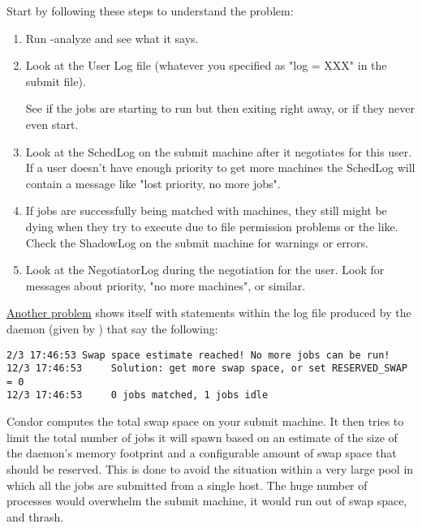 Start by following these steps to understand the problem:

\begin{enumerate}

\item Run  -analyze and see what it says.

\item Look at the User Log file (whatever you specified as "log = XXX"
in the submit file).

See if the jobs are starting to run but then exiting right away, or if
they never even start.

\item Look at the SchedLog on the submit machine after it negotiates
for this user.
If a user doesn't have enough priority to get more machines the
SchedLog will contain a message like "lost priority, no more jobs".

\item If jobs are successfully being matched with machines, they
still might be dying when they try to execute due to file permission
problems or the like.
Check the ShadowLog on the submit machine for warnings or errors.

\item Look at the NegotiatorLog during the negotiation for the user.
Look for messages about priority, "no more machines", or similar.

\end{enumerate}

\underline{Another problem} shows itself
with statements within the log file produced by the 
daemon (given by )
that say the following:

\footnotesize
\begin{verbatim}
2/3 17:46:53 Swap space estimate reached! No more jobs can be run!
12/3 17:46:53     Solution: get more swap space, or set RESERVED_SWAP = 0
12/3 17:46:53     0 jobs matched, 1 jobs idle
\end{verbatim}
\normalsize

Condor computes the total swap space on your submit machine.
It then tries to limit the total number of jobs it
will spawn based on an estimate of the size of the 
daemon's memory footprint and a configurable amount of swap space
that should be reserved.
This is done to avoid the
situation within a very large pool
in which all the jobs are submitted from a single host.
The huge number of  processes would
overwhelm the submit machine,
it would run out of swap space, and thrash.

